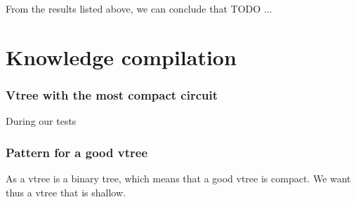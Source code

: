 From the results listed above, we can conclude that  TODO ...

\section{Knowledge compilation}
\subsubsection{Vtree with the most compact circuit}
During our tests 
\subsubsection{Pattern for a good vtree}
As a vtree is a binary tree, which means that a good vtree is compact. We want thus a vtree that is shallow. 
